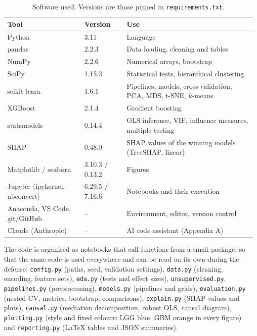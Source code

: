 \begin{table}[H]
\centering
\caption{Software used. Versions are those pinned in \texttt{requirements.\allowbreak{}txt}.}
\label{tab:mllb-tools}
\begin{tabularx}{\textwidth}{l l X}
\toprule
\textbf{Tool} & \textbf{Version} & \textbf{Use} \\
\midrule
Python & 3.11 & Language \\
pandas \cite{mckinney2010} & 2.2.3 & Data loading, cleaning and tables \\
NumPy \cite{harris2020} & 2.2.6 & Numerical arrays, bootstrap \\
SciPy \cite{virtanen2020} & 1.15.3 & Statistical tests, hierarchical clustering \\
scikit-learn \cite{pedregosa2011} & 1.6.1 & Pipelines, models, cross-validation, PCA, MDS, t-SNE, $k$-means \\
XGBoost \cite{chen2016} & 2.1.4 & Gradient boosting \\
statsmodels \cite{seabold2010} & 0.14.4 & OLS inference, VIF, influence measures, multiple testing \\
SHAP \cite{lundberg2017} & 0.48.0 & SHAP values of the winning models (TreeSHAP, linear) \\
Matplotlib \cite{hunter2007} / seaborn \cite{waskom2021} & 3.10.3 / 0.13.2 & Figures \\
Jupyter (ipykernel, nbconvert) & 6.29.5 / 7.16.6 & Notebooks and their execution \\
Anaconda, VS Code, git/GitHub & -- & Environment, editor, version control \\
Claude (Anthropic) & -- & AI code assistant (Appendix A) \\
\bottomrule
\end{tabularx}
\end{table}

The code is organised as notebooks that call functions from a small package, so that the same code
is used everywhere and can be read on its own during the defense:
\texttt{config.py} (paths, seed, validation settings), \texttt{data.py} (cleaning, encoding, feature
sets), \texttt{eda.py} (tests and effect sizes), \texttt{unsupervised.py}, \texttt{pipelines.py}
(preprocessing), \texttt{models.py} (pipelines and grids), \texttt{evaluation.py} (nested CV, metrics,
bootstrap, comparisons), \texttt{explain.py} (SHAP values and plots), \texttt{causal.py} (mediation
decomposition, robust OLS, causal diagram), \texttt{plotting.py} (style and fixed colours: LGG blue, GBM orange in every
figure) and \texttt{reporting.py} (\LaTeX{} tables and JSON summaries).
